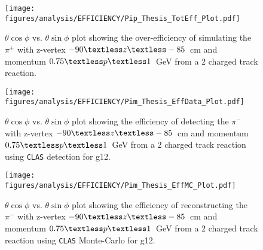 \documentclass[11pt,a4paper]{article}
\newcommand{\abbr}[1]{\textsc{\texttt{#1}}}
\def\figures{/Users/michaelkunkel/WORK/GIT_HUB/THESIS/figures/print}
\newlength{\figwidth}
\newlength{\hfigheight}
\begin{document}
								\begin{figure}[h!]\begin{center}
										\texttt{[image: \\figures/analysis/EFFICIENCY/Pip\_Thesis\_TotEff\_Plot.pdf]}
										\caption[$\theta \cos\phi$ vs. $\theta \sin\phi$ plot showing the over-efficiency of simulating the $\pi^+$ with z-vertex $-90\textless z\textless-85$~cm and momentum $0.75\textless p \textless 1$~GeV from a 2 charged track reaction]{\label{fig:toteff_pip} $\theta \cos\phi$ vs. $\theta \sin\phi$ plot showing the over-efficiency of simulating the $\pi^+$ with z-vertex $-90\textless z\textless-85$~cm and momentum $0.75\textless p \textless 1$~GeV from a 2 charged track reaction.}
									\end{center}\end{figure}
									\begin{figure}[h!]\begin{center}
											\texttt{[image: \\figures/analysis/EFFICIENCY/Pim\_Thesis\_EffData\_Plot.pdf]}
											\caption[$\theta \cos\phi$ vs. $\theta \sin\phi$ plot showing the efficiency of detecting the $\pi^-$ with z-vertex $-90\textless z\textless-85$~cm and momentum $0.75\textless p \textless 1$~GeV from a 2 charged track reaction using \abbr{CLAS} detection for g12]{\label{fig:eff_pim_data} $\theta \cos\phi$ vs. $\theta \sin\phi$ plot showing the efficiency of detecting the $\pi^-$ with z-vertex $-90\textless z\textless-85$~cm and momentum $0.75\textless p \textless 1$~GeV from a 2 charged track reaction using \abbr{CLAS} detection for g12.}
										\end{center}\end{figure}
										\begin{figure}[h!]\begin{center}
												\texttt{[image: \\figures/analysis/EFFICIENCY/Pim\_Thesis\_EffMC\_Plot.pdf]}
												\caption[$\theta \cos\phi$ vs. $\theta \sin\phi$ plot showing the efficiency of reconstructing the $\pi^-$ with z-vertex $-90\textless z\textless-85$~cm and momentum $0.75\textless p \textless 1$~GeV from a 2 charged track reaction using \abbr{CLAS} Monte-Carlo for g12]{\label{fig:eff_pim_MC} $\theta \cos\phi$ vs. $\theta \sin\phi$ plot showing the efficiency of reconstructing the $\pi^-$ with z-vertex $-90\textless z\textless-85$~cm and momentum $0.75\textless p \textless 1$~GeV from a 2 charged track reaction using \abbr{CLAS} Monte-Carlo for g12.}
											\end{center}\end{figure}
\end{document}
